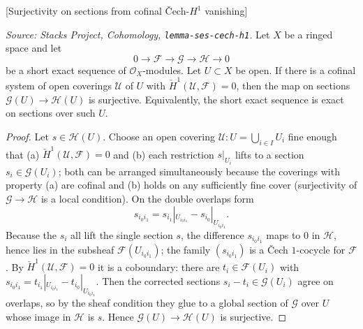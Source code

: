 \begin{lemma}

[Surjectivity on sections from cofinal {\v C}ech-$H^1$ vanishing]
  \label{mk-lem:ses_cech_h1}

  \textit{Source: Stacks Project, Cohomology,
  \texttt{lemma-ses-cech-h1}.}
  Let \(X\) be a ringed space and let
  \[
    0 \to \mathcal{F} \to \mathcal{G} \to \mathcal{H} \to 0
  \]
  be a short exact sequence of \(\mathcal{O}_X\)-modules. Let \(U \subset X\) be
  open. If there is a cofinal system of open coverings \(\mathcal{U}\) of \(U\) with
  \(\check{H}^1(\mathcal{U}, \mathcal{F}) = 0\), then the map on sections
  \(\mathcal{G}(U) \to \mathcal{H}(U)\) is surjective. Equivalently, the short exact
  sequence is exact on sections over such \(U\).
\end{lemma}
\begin{proof}
  Let \(s \in \mathcal{H}(U)\). Choose an open covering \(\mathcal{U} : U =
  \bigcup_{i \in I} U_i\) fine enough that (a) \(\check{H}^1(\mathcal{U},
  \mathcal{F}) = 0\) and (b) each restriction \(s|_{U_i}\) lifts to a section
  \(s_i \in \mathcal{G}(U_i)\); both can be arranged simultaneously because the
  coverings with property (a) are cofinal and (b) holds on any sufficiently fine
  cover (surjectivity of \(\mathcal{G} \to \mathcal{H}\) is a local condition).
  On the double overlaps form
  \[
    s_{i_0 i_1} = s_{i_1}|_{U_{i_0 i_1}} - s_{i_0}|_{U_{i_0 i_1}}.
  \]
  Because the \(s_i\) all lift the single section \(s\), the difference
  \(s_{i_0 i_1}\) maps to \(0\) in \(\mathcal{H}\), hence lies in the subsheaf
  \(\mathcal{F}(U_{i_0 i_1})\); the family \((s_{i_0 i_1})\) is a {\v C}ech
  \(1\)-cocycle for \(\mathcal{F}\). By \(\check{H}^1(\mathcal{U}, \mathcal{F}) = 0\)
  it is a coboundary: there are \(t_i \in \mathcal{F}(U_i)\) with
  \(s_{i_0 i_1} = t_{i_1}|_{U_{i_0 i_1}} - t_{i_0}|_{U_{i_0 i_1}}\). Then the
  corrected sections \(s_i - t_i \in \mathcal{G}(U_i)\) agree on overlaps, so by the
  sheaf condition they glue to a global section of \(\mathcal{G}\) over \(U\) whose
  image in \(\mathcal{H}\) is \(s\). Hence \(\mathcal{G}(U) \to \mathcal{H}(U)\) is
  surjective.
\end{proof}

